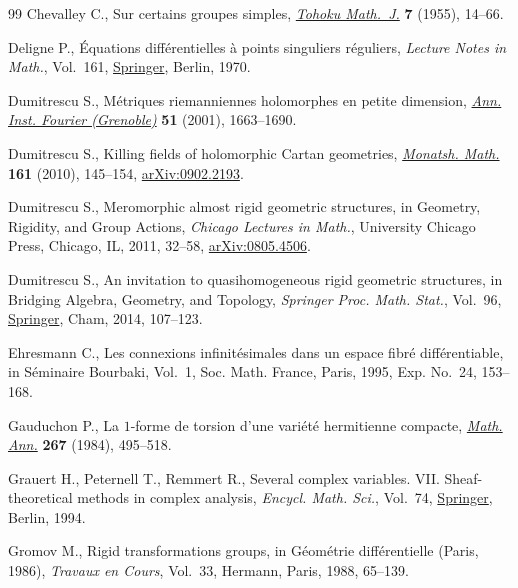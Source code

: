 \documentclass[10pt,a4paper]{amsart}
\numberwithin{equation}{section}
\begin{document}
\begin{thebibliography}{99}
Chevalley C., Sur certains groupes simples, \href{https://doi.org/10.2748/tmj/1178245104}{\textit{Tohoku Math.~J.}} \textbf{7}
 (1955), 14--66.

Deligne P., \'Equations diff\'erentielles \`a points singuliers r\'eguliers,
 \textit{Lecture Notes in Math.}, Vol.~161, \href{https://doi.org/10.1007/BFb0061194}{Springer}, Berlin, 1970.

Dumitrescu S., M\'etriques riemanniennes holomorphes en petite dimension,
 \href{https://doi.org/10.5802/aif.1870}{\textit{Ann. Inst. Fourier (Grenoble)}} \textbf{51} (2001), 1663--1690.

Dumitrescu S., Killing fields of holomorphic {C}artan geometries,
 \href{https://doi.org/10.1007/s00605-009-0135-x}{\textit{Monatsh. Math.}} \textbf{161} (2010), 145--154, \href{https://arxiv.org/abs/0902.2193}{arXiv:0902.2193}.

Dumitrescu S., Meromorphic almost rigid geometric structures, in Geometry,
 Rigidity, and Group Actions, \textit{Chicago Lectures in Math.}, University Chicago
 Press, Chicago, IL, 2011, 32--58, \href{https://arxiv.org/abs/0805.4506}{arXiv:0805.4506}.

Dumitrescu S., An invitation to quasihomogeneous rigid geometric structures, in
 Bridging Algebra, Geometry, and Topology, \textit{Springer Proc. Math.
 Stat.}, Vol.~96, \href{https://doi.org/10.1007/978-3-319-09186-0_7}{Springer}, Cham, 2014, 107--123.

Ehresmann C., Les connexions infinit\'esimales dans un espace fibr\'e
 diff\'erentiable, in S\'eminaire {B}ourbaki, {V}ol.~1, Soc. Math. France,
 Paris, 1995, Exp. No.~24, 153--168.

Gauduchon P., La {$1$}-forme de torsion d'une vari\'et\'e hermitienne compacte,
 \href{https://doi.org/10.1007/BF01455968}{\textit{Math. Ann.}} \textbf{267} (1984), 495--518.

Grauert H., Peternell T., Remmert R., Several complex variables. {VII}.
 Sheaf-theoretical methods in complex analysis, \textit{Encycl. Math. Sci.}, Vol.~74, \href{https://doi.org/10.1007/978-3-662-09873-8}{Springer}, Berlin, 1994.

Gromov M., Rigid transformations groups, in G\'eom\'etrie diff\'erentielle
 ({P}aris, 1986), \textit{Travaux en Cours}, Vol.~33, Hermann, Paris, 1988,
 65--139.


\end{thebibliography}
\end{document}
